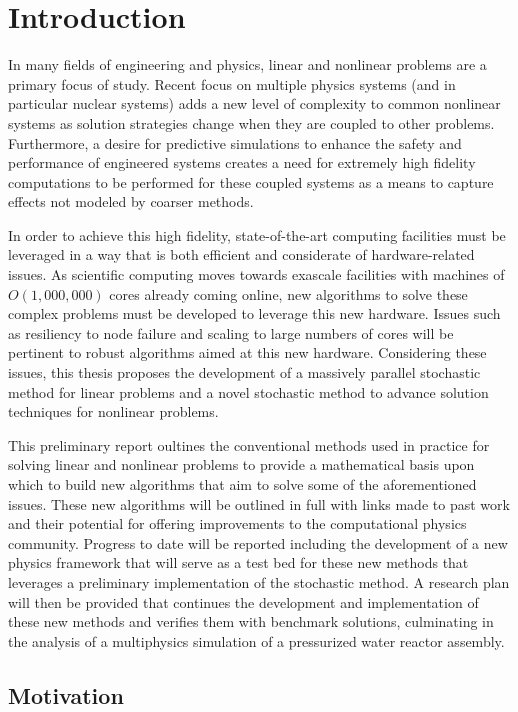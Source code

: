 \chapter{Introduction}
\label{ch:introduction}

In many fields of engineering and physics, linear and nonlinear
problems are a primary focus of study. Recent focus on multiple
physics systems (and in particular nuclear systems) adds a new level
of complexity to common nonlinear systems as solution strategies
change when they are coupled to other problems. Furthermore, a desire
for predictive simulations to enhance the safety and performance of
engineered systems creates a need for extremely high fidelity
computations to be performed for these coupled systems as a means to
capture effects not modeled by coarser methods.

In order to achieve this high fidelity, state-of-the-art computing
facilities must be leveraged in a way that is both efficient and
considerate of hardware-related issues. As scientific computing moves
towards exascale facilities with machines of $O(1,000,000)$ cores
already coming online, new algorithms to solve these complex problems
must be developed to leverage this new hardware. Issues such as
resiliency to node failure and scaling to large numbers of cores will
be pertinent to robust algorithms aimed at this new
hardware. Considering these issues, this thesis proposes the
development of a massively parallel stochastic method for linear
problems and a novel stochastic method to advance solution techniques
for nonlinear problems.

This preliminary report oultines the conventional methods used in
practice for solving linear and nonlinear problems to provide a
mathematical basis upon which to build new algorithms that aim to
solve some of the aforementioned issues. These new algorithms will be
outlined in full with links made to past work and their potential for
offering improvements to the computational physics community. Progress
to date will be reported including the development of a new physics
framework that will serve as a test bed for these new methods that
leverages a preliminary implementation of the stochastic method. A
research plan will then be provided that continues the development and
implementation of these new methods and verifies them with benchmark
solutions, culminating in the analysis of a multiphysics simulation of
a pressurized water reactor assembly.

\section{Motivation}
\label{sec:motivation}

